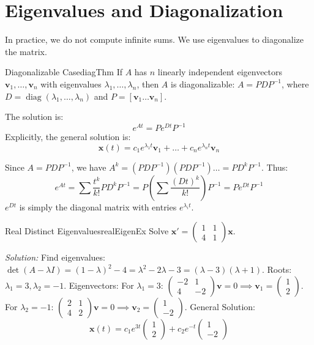 \documentclass{book}
\newenvironment{Proof}[1][]
  {\begin{ProofTcb}[#1]}
  {\end{ProofTcb}}
\begin{document}
\section{Eigenvalues and Diagonalization}

In practice, we do not compute infinite sums. We use eigenvalues to diagonalize the matrix.

\begin{thm}{Diagonalizable Case}{diagThm}
    If $A$ has $n$ linearly independent eigenvectors $\mathbf{v}_1, \dots, \mathbf{v}_n$ with eigenvalues $\lambda_1, \dots, \lambda_n$, then $A$ is diagonalizable: $A = PDP^{-1}$, where $D = \operatorname{diag}(\lambda_1, \dots, \lambda_n)$ and $P = [\mathbf{v}_1 \dots \mathbf{v}_n]$.

    The solution is:
    \[
        e^{At} = P e^{Dt} P^{-1}
    \]
    Explicitly, the general solution is:
    \[
        \mathbf{x}(t) = c_1 e^{\lambda_1 t}\mathbf{v}_1 + \dots + c_n e^{\lambda_n t}\mathbf{v}_n
    \]
\end{thm}

\begin{Proof}
    Since $A = PDP^{-1}$, we have $A^k = (PDP^{-1})(PDP^{-1})\dots = PD^k P^{-1}$.
    Thus:
    \[
        e^{At} = \sum \frac{t^k}{k!} PD^k P^{-1} = P \left( \sum \frac{(Dt)^k}{k!} \right) P^{-1} = P e^{Dt} P^{-1}
    \]
    $e^{Dt}$ is simply the diagonal matrix with entries $e^{\lambda_i t}$.
\end{Proof}

\begin{example}{Real Distinct Eigenvalues}{realEigenEx}
    Solve $\mathbf{x}' = \begin{pmatrix} 1 & 1 \\ 4 & 1 \end{pmatrix}\mathbf{x}$.

    \emph{Solution:}
    Find eigenvalues: $\det(A - \lambda I) = (1-\lambda)^2 - 4 = \lambda^2 - 2\lambda - 3 = (\lambda - 3)(\lambda + 1)$.
    Roots: $\lambda_1 = 3, \lambda_2 = -1$.
    Eigenvectors:
    For $\lambda_1 = 3$: $\begin{pmatrix} -2 & 1 \\ 4 & -2 \end{pmatrix}\mathbf{v} = 0 \implies \mathbf{v}_1 = \begin{pmatrix} 1 \\ 2 \end{pmatrix}$.
    For $\lambda_2 = -1$: $\begin{pmatrix} 2 & 1 \\ 4 & 2 \end{pmatrix}\mathbf{v} = 0 \implies \mathbf{v}_2 = \begin{pmatrix} 1 \\ -2 \end{pmatrix}$.
    General Solution:
    \[
        \mathbf{x}(t) = c_1 e^{3t} \begin{pmatrix} 1 \\ 2 \end{pmatrix} + c_2 e^{-t} \begin{pmatrix} 1 \\ -2 \end{pmatrix}
    \]
\end{example}
\end{document}
